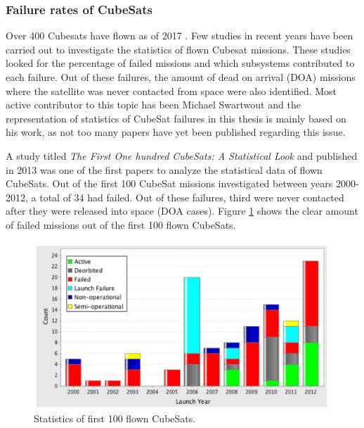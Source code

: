 \documentclass[english,12pt,a4paper,pdftex,elec,utf8]{aaltothesis}
\begin{document}
\subsubsection{Failure rates of CubeSats}
Over 400 Cubesats have flown as of 2017 \cite{Swart2016}. Few studies in recent years have been carried out to investigate the statistics of flown Cubesat missions. These studies looked for the percentage of failed missions and which subsystems contributed to each failure. Out of these failures, the amount of dead on arrival (DOA) missions where the satellite was never contacted from space were also identified. Most active contributor to this topic has been Michael Swartwout and the representation of statistics of CubeSat failures in this thesis is mainly based on his work, as not too many papers have yet been published regarding this issue.\par 
A study titled \textit{The First One hundred CubeSats: A Statistical Look} and published in 2013 was one of the first papers to analyze the statistical data of flown CubeSats. Out of the first 100 CubeSat missions investigated between years 2000-2012, a total of 34 had failed. Out of these failures, third were never contacted after they were released into space (DOA cases). Figure \ref{100first} shows the clear amount of failed missions out of the first 100 flown CubeSats. \cite{Swart1} \par
\begin{figure}[h!]
\includegraphics[scale=0.3]{2013_failures}
\caption{Statistics of first 100 flown CubeSats. \cite{Swart1}}
\label{100first}
\end{figure} 
\end{document}
